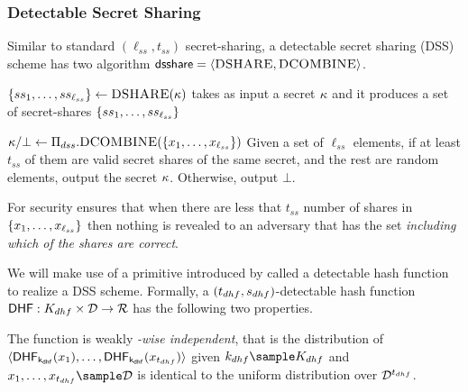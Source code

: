 \newcommand{\secretShareThreshold}{\ensuremath{t_{ss}}\xspace}
\newcommand{\secretShareLength}{\ensuremath{\ell_{ss}}\xspace}
\newcommand{\dhfLength}{\ensuremath{\ell_{dhf}}\xspace}


\subsubsection{Detectable Secret Sharing}
%
Similar to standard $(\secretShareLength, \secretShareThreshold)$ secret-sharing, a detectable secret sharing (DSS) scheme has two algorithm $\mathsf{dsshare} = \langle \textsc{DSHARE}, \textsc{DCOMBINE}\rangle$. 

\itemListStart
\item $\{ \secretShare{1},\dots, \secretShare{\secretShareLength} \} \gets \DSShare(\genericSymmKey)$ takes as input a secret $\kappa$ and it produces a set of secret-shares $\{ \secretShare{1},\dots, \secretShare{\secretShareLength} \}$
\item $\genericSymmKey/\bot \gets \dssProtocol.\DSCombine(\{\genericSetElmt[1], \dots, \genericSetElmt[\secretShareLength] \})$ Given a set of $\secretShareLength$ elements, if at least \secretShareThreshold of them are valid secret shares of the same secret, and the rest are random elements, output the secret $\kappa$. Otherwise, output $\bot$. 
\itemListEnd

For security \dssProtocol ensures that when there are less that \secretShareThreshold number of shares in $\{\genericSetElmt[1], \dots, \genericSetElmt[\secretShareLength] \}$ then nothing is revealed to an adversary that has the set \emph{including which of the shares are correct}. 



%
We will make use of a primitive introduced by \citet{bhowmick2021apple} called a detectable hash 
function to realize a DSS scheme. Formally, a $(t_{dhf}, s_{dhf})$-detectable 
hash function $\dhf: \dhfKeySpace \times \dhfDomain \rightarrow \dhfRange$ has the following 
two properties.

\enumListStart
\item The function is weakly \textit{\dhfParamMatchThreshold-wise
  independent}, that is the distribution of
  $\langle\dhf[\dhfKey](\genericFnInput[1]), \dots,
  \dhf[\dhfKey](\genericFnInput[\dhfParamMatchThreshold])\rangle$
  given $\dhfKey \getsr \dhfKeySpace$ and $\genericFnInput[1], \dots,
  \genericFnInput[\dhfParamMatchThreshold] \getsr \dhfDomain$ is
  identical to the uniform distribution over
  $\mathcal{D}^{t_{dhf}}$.
	
